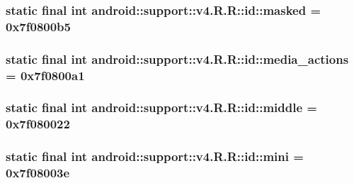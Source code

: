 \hypertarget{classandroid_1_1support_1_1v4_1_1_r_1_1id_b25a5b68bb3d5e993ead7f13125a7aba}{
\subsubsection[{masked}]{\setlength{\rightskip}{0pt plus 5cm}static final int android::support::v4.R.R::id::masked = 0x7f0800b5}}
\label{classandroid_1_1support_1_1v4_1_1_r_1_1id_b25a5b68bb3d5e993ead7f13125a7aba}


\hypertarget{classandroid_1_1support_1_1v4_1_1_r_1_1id_e32bffaf7813d029d69024bb57ebbab3}{
\subsubsection[{media\_\-actions}]{\setlength{\rightskip}{0pt plus 5cm}static final int android::support::v4.R.R::id::media\_\-actions = 0x7f0800a1}}
\label{classandroid_1_1support_1_1v4_1_1_r_1_1id_e32bffaf7813d029d69024bb57ebbab3}


\hypertarget{classandroid_1_1support_1_1v4_1_1_r_1_1id_e179375089fefcd27d6a05372a584e7f}{
\subsubsection[{middle}]{\setlength{\rightskip}{0pt plus 5cm}static final int android::support::v4.R.R::id::middle = 0x7f080022}}
\label{classandroid_1_1support_1_1v4_1_1_r_1_1id_e179375089fefcd27d6a05372a584e7f}


\hypertarget{classandroid_1_1support_1_1v4_1_1_r_1_1id_73791de1a13cda31b7c8bc90f3f3fc97}{
\subsubsection[{mini}]{\setlength{\rightskip}{0pt plus 5cm}static final int android::support::v4.R.R::id::mini = 0x7f08003e}}
\label{classandroid_1_1support_1_1v4_1_1_r_1_1id_73791de1a13cda31b7c8bc90f3f3fc97}


